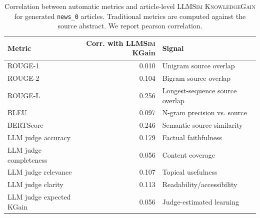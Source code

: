 \begin{table}[t]
\centering
\small
\setlength{\tabcolsep}{5pt}
\begin{tabular}{lrl}
\toprule
Metric & Corr. with \textsc{LLMSim} KGain & Signal \\
\midrule
ROUGE-1 & 0.010 & Unigram source overlap \\
ROUGE-2 & 0.104 & Bigram source overlap \\
ROUGE-L & 0.256 & Longest-sequence source overlap \\
BLEU & 0.097 & N-gram precision vs. source \\
BERTScore & -0.246 & Semantic source similarity \\
LLM judge accuracy & 0.179 & Factual faithfulness \\
LLM judge completeness & 0.056 & Content coverage \\
LLM judge relevance & 0.107 & Topical usefulness \\
LLM judge clarity & 0.113 & Readability/accessibility \\
LLM judge expected KGain & 0.056 & Judge-estimated learning \\
\bottomrule
\end{tabular}
\caption{Correlation between automatic metrics and article-level \textsc{LLMSim} \textsc{KnowledgeGain} for generated \texttt{news\_0} articles. Traditional metrics are computed against the source abstract. We report pearson correlation.}
\label{tab:metrics_vs_llmsim_kgain}
\end{table}
